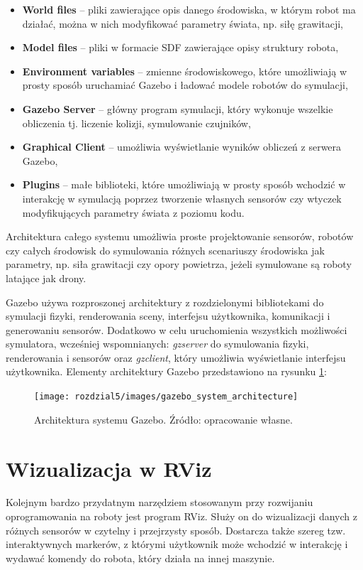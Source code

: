 \begin{itemize}
    \item \textbf{World files} -- pliki zawierające opis danego środowiska, 
    w którym robot ma działać, można w nich modyfikować parametry świata, 
    np. siłę grawitacji,
    \item \textbf{Model files} -- pliki w formacie SDF zawierające opisy 
    struktury robota,
    \item \textbf{Environment variables} -- zmienne środowiskowego, które 
    umożliwiają w prosty sposób uruchamiać Gazebo i ładować modele robotów 
    do symulacji,
    \item \textbf{Gazebo Server} -- główny program symulacji, który wykonuje 
    wszelkie obliczenia tj. liczenie kolizji, symulowanie czujników,
    \item \textbf{Graphical Client} -- umożliwia wyświetlanie wyników 
    obliczeń z serwera Gazebo,
    \item \textbf{Plugins} -- małe biblioteki, które umożliwiają w prosty 
    sposób wchodzić w interakcję w symulacją poprzez tworzenie własnych 
    sensorów czy wtyczek modyfikujących parametry świata z poziomu kodu.
\end{itemize}

Architektura całego systemu umożliwia proste projektowanie sensorów, robotów
czy całych środowisk do symulowania różnych scenariuszy środowiska jak 
parametry, np. siła grawitacji czy opory powietrza, jeżeli symulowane są roboty
latające jak drony. 

Gazebo używa rozproszonej architektury z rozdzielonymi bibliotekami do 
symulacji fizyki, renderowania sceny, interfejsu użytkownika, komunikacji i 
generowaniu sensorów. Dodatkowo w celu uruchomienia wszystkich możliwości 
symulatora, wcześniej wspomnianych: \textit{gzserver} do symulowania fizyki, 
renderowania i sensorów oraz \textit{gzclient}, który umożliwia wyświetlanie 
interfejsu użytkownika. Elementy architektury Gazebo przedstawiono na rysunku 
\ref{fig:gazebosystemarchitecture}:

\begin{figure}
	\centering
	\texttt{[image: rozdzial5/images/gazebo\_system\_architecture]}
	\caption{Architektura systemu Gazebo. Źródło: opracowanie własne.}
	\label{fig:gazebosystemarchitecture}
\end{figure}


\section{Wizualizacja w RViz}
Kolejnym bardzo przydatnym narzędziem stosowanym przy rozwijaniu oprogramowania na roboty
jest program RViz. Służy on do wizualizacji danych z różnych sensorów w czytelny
i przejrzysty sposób. Dostarcza także szereg tzw. interaktywnych markerów, z którymi
użytkownik może wchodzić w interakcję i wydawać komendy do robota, który działa na
innej maszynie. 

